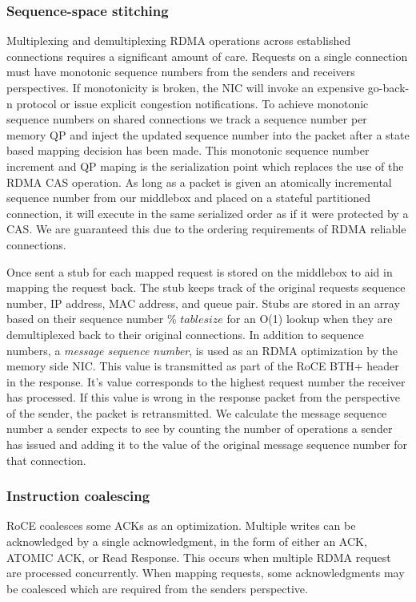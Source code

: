 \subsubsection{Sequence-space stitching}

Multiplexing and demultiplexing RDMA operations across established connections
requires a significant amount of care. Requests on a single connection must have
monotonic sequence numbers from the senders and receivers perspectives. If
monotonicity is broken, the NIC will invoke an expensive go-back-n protocol or
issue explicit congestion notifications. To achieve monotonic sequence numbers
on shared connections we track a sequence number per memory QP and inject the
updated sequence number into the packet after a state based mapping decision has
been made.
This monotonic sequence number increment and QP maping is the serialization
point which replaces the use of the RDMA CAS operation. As long as a packet is
given an atomically incremental sequence number from our middlebox and placed on
a stateful partitioned connection, it will execute in the same serialized order
as if it were protected by a CAS. We are guaranteed this due to the ordering
requirements of RDMA reliable connections.

Once sent a stub for each mapped request is stored on the middlebox to aid in
mapping the request back. The stub keeps track of the original requests sequence
number, IP address, MAC address, and queue pair. Stubs are stored in an array
based on their sequence number \% $table size$ for an O(1) lookup when they are
demultiplexed back to their original connections.
In addition to sequence numbers, a \textit{message sequence number}, is used as
an RDMA optimization by the memory side NIC. This value is transmitted as part
of the RoCE BTH+ header in the response. It's value corresponds to the highest
request number the receiver has processed. If this value is wrong in the
response packet from the perspective of the sender, the packet is retransmitted.
We calculate the message sequence number a sender expects to see by counting the
number of operations a sender has issued and adding it to the value of the
original message sequence number for that connection.

\subsubsection{Instruction coalescing} RoCE coalesces some ACKs as an optimization.
Multiple writes can be acknowledged by a single acknowledgment, in the form of
either an ACK, ATOMIC ACK, or Read Response. This occurs when multiple RDMA
request are processed concurrently. When mapping requests, some acknowledgments
may be coalesced which are required from the senders perspective.

